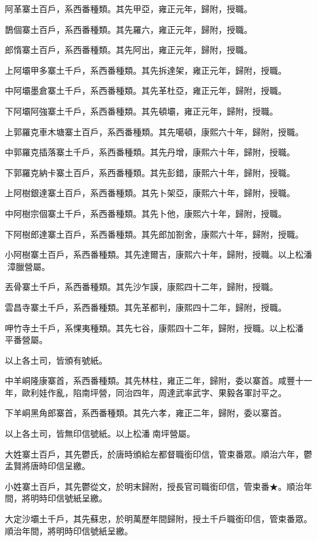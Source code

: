 \begin{pinyinscope}
阿革寨土百戶，系西番種類。其先甲亞，雍正元年，歸附，授職。

鵲個寨土百戶，系西番種類。其先羅六，雍正元年，歸附，授職。

郎惰寨土百戶，系西番種類。其先阿出，雍正元年，歸附，授職。

上阿壩甲多寨土千戶，系西番種類。其先拆達架，雍正元年，歸附，授職。

中阿壩墨倉寨土千戶，系西番種類。其先革杜亞，雍正元年，歸附，授職。

下阿壩阿強寨土千戶，系西番種類。其先頓壩，雍正元年，歸附，授職。

上郭羅克車木塘寨土百戶，系西番種類。其先噶頓，康熙六十年，歸附，授職。

中郭羅克插落寨土千戶，系西番種類。其先丹增，康熙六十年，歸附，授職。

下郭羅克納卡寨土百戶，系西番種類。其先彭錯，康熙六十年，歸附，授職。

上阿樹銀達寨土百戶，系西番種類。其先卜架亞，康熙六十年，歸附，授職。

中阿樹宗個寨土千戶，系西番種類。其先卜他，康熙六十年，歸附，授職。

下阿樹郎達寨土百戶，系西番種類。其先郎加劄舍，康熙六十年，歸附，授職。

小阿樹寨土百戶，系西番種類。其先達爾吉，康熙六十年，歸附，授職。以上松潘漳臘營屬。

丟骨寨土千戶，系西番種類。其先沙乍謨，康熙四十二年，歸附，授職。

雲昌寺寨土千戶，系西番種類。其先革都判，康熙四十二年，歸附，授職。

呷竹寺土千戶，系惈夷種類。其先七谷，康熙四十二年，歸附，授職。以上松潘平番營屬。

以上各土司，皆頒有號紙。

中羊峒隆康寨首，系西番種類。其先林柱，雍正二年，歸附，委以寨首。咸豐十一年，歐利娃作亂，陷南坪營，同治四年，周達武率武字、果毅各軍討平之。

下羊峒黑角郎寨首，系西番種類。其先六孝，雍正二年，歸附，委以寨首。

以上各土司，皆無印信號紙。以上松潘南坪營屬。

大姓寨土百戶，其先鬱氏，於唐時頒給左都督職銜印信，管束番眾。順治六年，鬱孟賢將唐時印信呈繳。

小姓寨土百戶，其先鬱從文，於明末歸附，授長官司職銜印信，管束番★。順治年間，將明時印信號紙呈繳。

大定沙壩土千戶，其先蘇忠，於明萬歷年間歸附，授土千戶職銜印信，管束番眾。順治年間，將明時印信號紙呈繳。


\end{pinyinscope}
